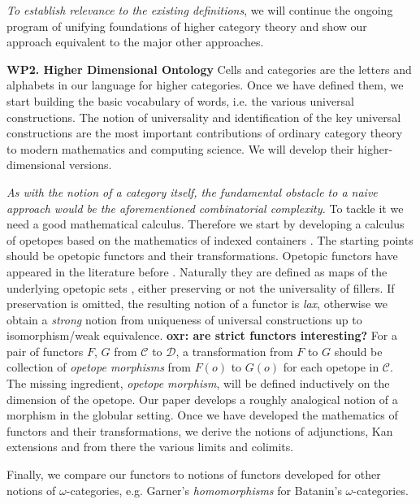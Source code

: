 \emph{To establish relevance to the existing definitions}, we will
continue the ongoing program of unifying foundations of higher
category theory and show our approach equivalent to the major other
approaches.


{\bf WP2. Higher Dimensional Ontology}
%
Cells and categories are the letters and alphabets in our language for
higher categories. Once we have defined them, we start building the
basic vocabulary of words, i.e. the various universal
constructions. The notion of universality and identification of the
key universal constructions are the most important
contributions of ordinary category theory to modern mathematics and
computing science.  We will develop their higher-dimensional versions.

\emph{As with the notion of a category itself, the fundamental
  obstacle to a naive approach would be the aforementioned
  combinatorial complexity.}  To tackle it we need a good mathematical
calculus. Therefore we start by developing a calculus of opetopes
based on the mathematics of indexed containers \cite{?,?,?}.
%
%
The starting points should be opetopic functors and
their transformations. Opetopic functors have appeared in the literature
before \cite{}.  Naturally they are defined as maps of the underlying
opetopic sets \cite{?}, either preserving or not the universality of
fillers. If preservation is omitted, the resulting notion of a functor
is \emph{lax}, otherwise we obtain a \emph{strong} notion from
uniqueness of universal constructions up to isomorphism/weak equivalence.
%
\textbf{oxr: are strict functors interesting?}
%
For a pair of functors $F$, $G$ from $\mathcal{C}$ to $\mathcal{D}$, a
transformation from $F$ to $G$ should be collection of \emph{opetope
  morphisms} from $F(o)$ to $G(o)$ for each opetope in
$\mathcal{C}$. The missing ingredient, \emph{opetope morphism}, will
be defined inductively on the dimension of the opetope. Our paper
\cite{} develops a roughly analogical notion of a morphism in the
globular setting. Once we have developed the mathematics of functors
and their transformations, we derive the notions of adjunctions, Kan
extensions and from there the various limits and colimits.

Finally, we compare our functors to notions of
functors developed for other notions of $\omega$-categories, e.g.
Garner's \emph{homomorphisms} \cite{} for Batanin's
$\omega$-categories. 

